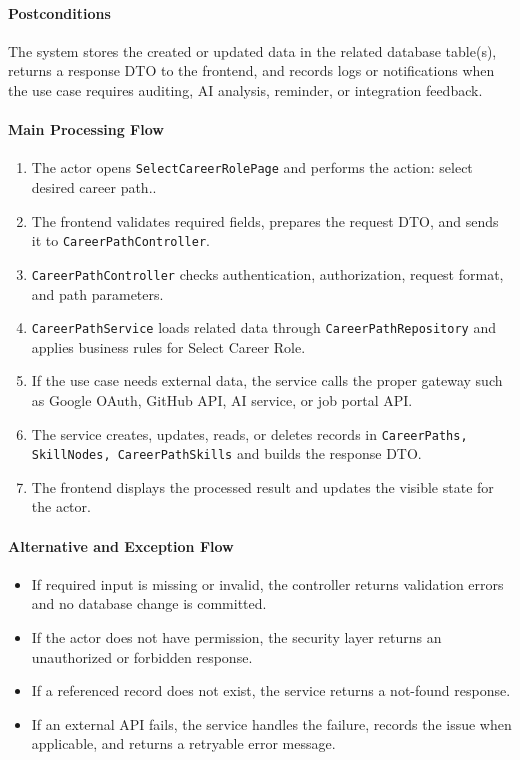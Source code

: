 \paragraph{Postconditions}

The system stores the created or updated data in the related database table(s), returns a response DTO to the frontend, and records logs or notifications when the use case requires auditing, AI analysis, reminder, or integration feedback.

\paragraph{Main Processing Flow}

\begin{enumerate}
    \item The actor opens \texttt{SelectCareerRolePage} and performs the action: select desired career path..
    \item The frontend validates required fields, prepares the request DTO, and sends it to \texttt{CareerPathController}.
    \item \texttt{CareerPathController} checks authentication, authorization, request format, and path parameters.
    \item \texttt{CareerPathService} loads related data through \texttt{CareerPathRepository} and applies business rules for Select Career Role.
    \item If the use case needs external data, the service calls the proper gateway such as Google OAuth, GitHub API, AI service, or job portal API.
    \item The service creates, updates, reads, or deletes records in \texttt{CareerPaths, SkillNodes, CareerPathSkills} and builds the response DTO.
    \item The frontend displays the processed result and updates the visible state for the actor.
\end{enumerate}

\paragraph{Alternative and Exception Flow}

\begin{itemize}
    \item If required input is missing or invalid, the controller returns validation errors and no database change is committed.
    \item If the actor does not have permission, the security layer returns an unauthorized or forbidden response.
    \item If a referenced record does not exist, the service returns a not-found response.
    \item If an external API fails, the service handles the failure, records the issue when applicable, and returns a retryable error message.
\end{itemize}

